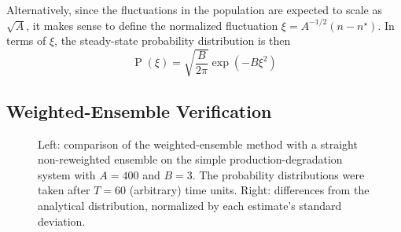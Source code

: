 \documentclass[english,letterpaper,12pt]{report}
\DeclareMathOperator{\Prob}{P}
\begin{document}
\begin{doublespacing}
Alternatively, since the fluctuations in the population are expected to scale as $\sqrt{A}$, it makes sense to define the normalized fluctuation $\xi = A^{-1/2}(n - n^\star)$. In terms of $\xi$, the steady-state probability distribution is then
\begin{equation}
    \Prob(\xi) = \sqrt{\frac{B}{2\pi}} \exp(-B \xi^2)
    \label{eq:pd-dist-xi}
\end{equation}

\subsection{Weighted-Ensemble Verification} %
\label{sub:pd-we-verif}

\begin{figure}[t]
    \makebox[\linewidth][c]{
        \begin{subfigure}{3in}
            \begin{center}
                
            \end{center}
            \label{sfg:pdwe4-comp}
        \end{subfigure}
        \begin{subfigure}{3in}
            \begin{center}
                
            \end{center}
            \label{sfg:pdwe4-chi}
        \end{subfigure}
    }
    \caption{Left: comparison of the weighted-ensemble method with a straight non-reweighted ensemble on the simple production-degradation system with $A=400$ and $B=3$. The probability distributions were taken after $T=60$ (arbitrary) time units. Right: differences from the analytical distribution, normalized by each estimate's standard deviation.}
    \label{fig:pdwe4}
\end{figure}


\end{doublespacing}
\end{document}

